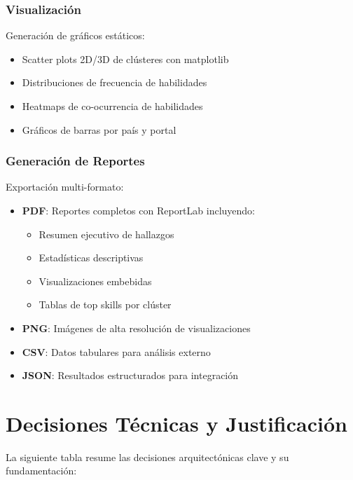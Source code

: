 \subsubsection{Visualización}

Generación de gráficos estáticos:
\begin{itemize}
    \item Scatter plots 2D/3D de clústeres con matplotlib
    \item Distribuciones de frecuencia de habilidades
    \item Heatmaps de co-ocurrencia de habilidades
    \item Gráficos de barras por país y portal
\end{itemize}

\subsubsection{Generación de Reportes}

Exportación multi-formato:
\begin{itemize}
    \item \textbf{PDF}: Reportes completos con ReportLab incluyendo:
    \begin{itemize}
        \item Resumen ejecutivo de hallazgos
        \item Estadísticas descriptivas
        \item Visualizaciones embebidas
        \item Tablas de top skills por clúster
    \end{itemize}
    \item \textbf{PNG}: Imágenes de alta resolución de visualizaciones
    \item \textbf{CSV}: Datos tabulares para análisis externo
    \item \textbf{JSON}: Resultados estructurados para integración
\end{itemize}

\section{Decisiones Técnicas y Justificación}

La siguiente tabla resume las decisiones arquitectónicas clave y su fundamentación:

